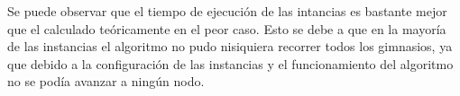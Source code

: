      Se puede observar que el tiempo de ejecución de las intancias es bastante mejor que el calculado teóricamente en el peor caso. Esto se debe a que en la mayoría de las instancias el algoritmo no pudo nisiquiera recorrer todos los gimnasios, ya que debido a la configuración de las instancias y el funcionamiento del algoritmo no se podía avanzar a ningún nodo.
